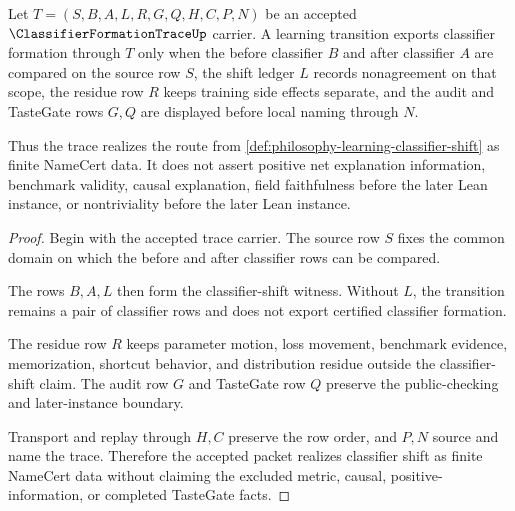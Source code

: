 \begin{theorem}
\label{thm:classifier-formation-trace-shift-witness}
Let $T=(S,B,A,L,R,G,Q,H,C,P,N)$ be an accepted $\ClassifierFormationTraceUp$ carrier. A learning transition exports classifier formation through $T$ only when the before classifier $B$ and after classifier $A$ are compared on the source row $S$, the shift ledger $L$ records nonagreement on that scope, the residue row $R$ keeps training side effects separate, and the audit and TasteGate rows $G,Q$ are displayed before local naming through $N$.

Thus the trace realizes the route from \autoref{def:philosophy-learning-classifier-shift} as finite NameCert data. It does not assert positive net explanation information, benchmark validity, causal explanation, field faithfulness before the later Lean instance, or nontriviality before the later Lean instance.
\end{theorem}
\begin{proof}
Begin with the accepted trace carrier. The source row $S$ fixes the common domain on which the before and after classifier rows can be compared.

The rows $B,A,L$ then form the classifier-shift witness. Without $L$, the transition remains a pair of classifier rows and does not export certified classifier formation.

The residue row $R$ keeps parameter motion, loss movement, benchmark evidence, memorization, shortcut behavior, and distribution residue outside the classifier-shift claim. The audit row $G$ and TasteGate row $Q$ preserve the public-checking and later-instance boundary.

Transport and replay through $H,C$ preserve the row order, and $P,N$ source and name the trace. Therefore the accepted packet realizes classifier shift as finite NameCert data without claiming the excluded metric, causal, positive-information, or completed TasteGate facts.
\end{proof}



